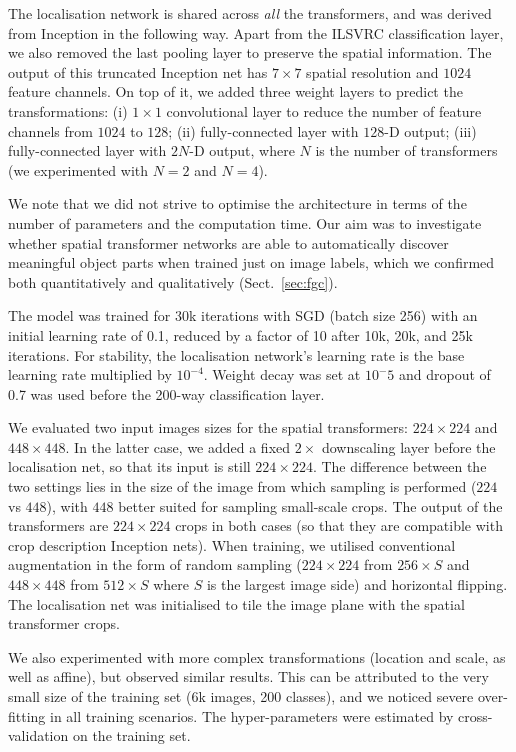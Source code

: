 \documentclass{article} %
\newcommand{\sref}[1]{Sect.~\ref{#1}}
\begin{document}
\begin{appendices}
The localisation network is shared across \emph{all} the transformers, and was derived from Inception in the following way. Apart from the ILSVRC classification layer, we also removed the last pooling layer
to preserve the spatial information. The output of this truncated Inception net has $7 \times 7$ spatial resolution and $1024$ feature channels.
On top of it, we added three weight layers to predict the transformations: 
(i) $1\times1$ convolutional layer to reduce the number of feature channels from $1024$ to $128$; 
(ii) fully-connected layer with $128$-D output;
(iii) fully-connected layer with $2N$-D output, where $N$ is the number of transformers (we experimented with $N=2$ and $N=4$). %

We note that we did not strive to optimise the architecture in terms of the number of parameters and the computation time. 
Our aim was to investigate whether spatial transformer networks are able to automatically discover meaningful object parts when trained just on image labels, which
we confirmed both quantitatively and qualitatively (\sref{sec:fgc}).

The model was trained for 30k iterations with SGD (batch size 256) with an initial learning rate of 0.1, reduced by a factor of 10 after 10k, 20k, and 25k iterations. For stability, the localisation network's learning rate is the base learning rate multiplied by $10^{-4}$. Weight decay was set at $10^-5$ and dropout of 0.7 was used before the 200-way classification layer.

We evaluated two input images sizes for the spatial transformers: $224\times 224$ and $448\times 448$. In the latter case, we added a fixed $2\times$ downscaling layer before the localisation net,
so that its input is still $224\times 224$. The difference between the two settings lies in the size of the image from which sampling is performed ($224$ vs $448$), with $448$ better
suited for sampling small-scale crops. The output of the transformers are $224\times224$ crops in both cases (so that they are compatible with crop description Inception nets).
When training, we utilised conventional augmentation in the form of random sampling ($224\times 224$ from $256\times S$ and $448\times 448$ from $512\times S$ where $S$ is the largest image side) and horizontal flipping.
The localisation net was initialised to tile the image plane with the spatial transformer crops.

We also experimented with more complex transformations (location and scale, as well as affine), but observed similar results.
This can be attributed to the very small size of the training set (6k images, 200 classes), and we noticed severe over-fitting in all training scenarios.
The hyper-parameters were estimated by cross-validation on the training set.

\end{appendices}
\end{document}
